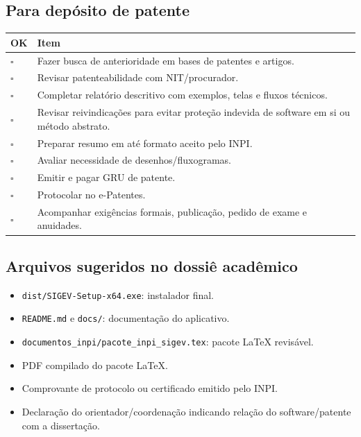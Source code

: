 \subsection{Para depósito de patente}

\begin{longtable}{p{}p{}}
\textbf{OK} & \textbf{Item} \\
\hline
$\square$ & Fazer busca de anterioridade em bases de patentes e artigos. \\
$\square$ & Revisar patenteabilidade com NIT/procurador. \\
$\square$ & Completar relatório descritivo com exemplos, telas e fluxos técnicos. \\
$\square$ & Revisar reivindicações para evitar proteção indevida de software em si ou método abstrato. \\
$\square$ & Preparar resumo em até formato aceito pelo INPI. \\
$\square$ & Avaliar necessidade de desenhos/fluxogramas. \\
$\square$ & Emitir e pagar GRU de patente. \\
$\square$ & Protocolar no e-Patentes. \\
$\square$ & Acompanhar exigências formais, publicação, pedido de exame e anuidades. \\
\end{longtable}

\subsection{Arquivos sugeridos no dossiê acadêmico}

\begin{itemize}
  \item \texttt{dist/SIGEV-Setup-x64.exe}: instalador final.
  \item \texttt{README.md} e \texttt{docs/}: documentação do aplicativo.
  \item \texttt{documentos\_inpi/pacote\_inpi\_sigev.tex}: pacote LaTeX revisável.
  \item PDF compilado do pacote LaTeX.
  \item Comprovante de protocolo ou certificado emitido pelo INPI.
  \item Declaração do orientador/coordenação indicando relação do software/patente com a dissertação.
\end{itemize}
